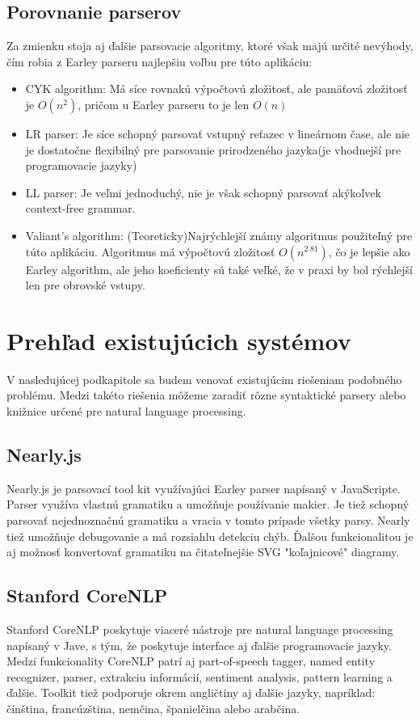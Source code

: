 \documentclass[12pt,a4paper]{report}
\theoremstyle{definition}
\theoremstyle{remark}
\begin{document}
\subsection{Porovnanie parserov}
Za zmienku stoja aj ďalšie parsovacie algoritmy, ktoré však majú určité nevýhody, čím robia z Earley parseru najlepšiu voľbu pre túto aplikáciu:
\begin{itemize}
\item CYK algorithm: Má síce rovnakú výpočtovú zložitosť, ale pamäťová zložitosť je $O(n^2)$, pričom u Earley parseru to je len $O(n)$ \cite{complexity}
\item LR parser: Je síce schopný parsovať vstupný reťazec v lineárnom čase, ale nie je dostatočne flexibilný pre parsovanie prirodzeného jazyka(je vhodnejší pre programovacie jazyky)
\item LL parser: Je veľmi jednoduchý, nie je však schopný parsovať akýkoľvek context-free grammar.
\item Valiant’s algorithm: (Teoreticky)Najrýchlejší známy algoritmus použiteľný pre túto aplikáciu. Algoritmus má výpočtovú zložitosť $O(n^{2.81})$, čo je lepšie ako Earley algorithm, ale jeho koeficienty sú také veľké, že v praxi by bol rýchlejší len pre obrovské vstupy.\cite{Tomita}
\end{itemize}

\section{Prehľad existujúcich systémov}
V nasledujúcej podkapitole sa budem venovať existujúcim riešeniam podobného problému. Medzi takéto riešenia môžeme zaradiť rôzne syntaktické parsery alebo knižnice určené pre natural language processing.

\subsection{Nearly.js}
Nearly.js je parsovací tool kit využívajúci Earley parser napísaný v JavaScripte. Parser využíva vlastnú gramatiku a umožňuje používanie makier. Je tiež schopný parsovať nejednoznačnú gramatiku a vracia v tomto prípade všetky parsy. Nearly tiež umožňuje debugovanie a má rozsiahlu detekciu chýb. Ďalšou funkcionalitou je aj možnosť konvertovať gramatiku na čitateľnejšie SVG "koľajnicové" diagramy.

\subsection{Stanford CoreNLP}
Stanford CoreNLP poskytuje viaceré nástroje pre natural language processing napísaný v Jave, s tým, že poskytuje interface aj ďalšie programovacie jazyky. Medzi funkcionality CoreNLP patrí aj part-of-speech tagger, named entity recognizer, parser, extrakciu informácií, sentiment analysis, pattern learning a ďalšie. Toolkit tiež podporuje okrem angličtiny aj ďalšie jazyky, napríklad: čínština, francúzština, nemčina, španielčina alebo arabčina.
\end{document}
